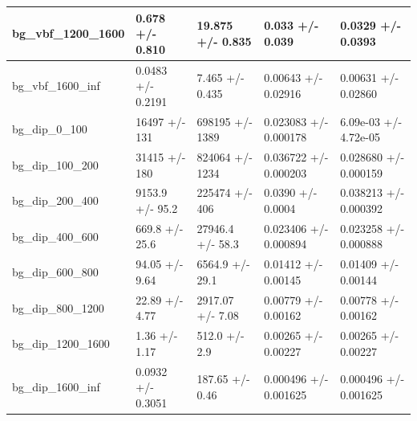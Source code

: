 \documentclass[a4paper, 10pt]{article}
\begin{document}
\begin{table}[H]
\begin{center}
\begin{tabular}{|m{20.0mm}|m{27.0mm}|m{27.0mm}|m{33.0mm}|m{32.0mm}|}
      \hline
      {\cellcolor{white}         bg\_vbf\_1200\_1600}& {\cellcolor{white}         0.678 +/\-- 0.810}& {\cellcolor{white}         19.875 +/\-- 0.835}& {\cellcolor{white}         0.033 +/\-- 0.039}& {\cellcolor{white}         0.0329 +/\-- 0.0393}\\
      \hline
      {\cellcolor{white}         bg\_vbf\_1600\_inf}& {\cellcolor{white}         0.0483 +/\-- 0.2191}& {\cellcolor{white}         7.465 +/\-- 0.435}& {\cellcolor{white}         0.00643 +/\-- 0.02916}& {\cellcolor{white}         0.00631 +/\-- 0.02860}\\
      \hline
      {\cellcolor{white}         bg\_dip\_0\_100}& {\cellcolor{white}         16497 +/\-- 131}& {\cellcolor{white}         698195 +/\-- 1389}& {\cellcolor{white}         0.023083 +/\-- 0.000178}& {\cellcolor{white}         6.09e-03 +/\-- 4.72e-05}\\
      \hline
      {\cellcolor{white}         bg\_dip\_100\_200}& {\cellcolor{white}         31415 +/\-- 180}& {\cellcolor{white}         824064 +/\-- 1234}& {\cellcolor{white}         0.036722 +/\-- 0.000203}& {\cellcolor{white}         0.028680 +/\-- 0.000159}\\
      \hline
      {\cellcolor{white}         bg\_dip\_200\_400}& {\cellcolor{white}         9153.9 +/\-- 95.2}& {\cellcolor{white}         225474 +/\-- 406}& {\cellcolor{white}         0.0390 +/\-- 0.0004}& {\cellcolor{white}         0.038213 +/\-- 0.000392}\\
      \hline
      {\cellcolor{white}         bg\_dip\_400\_600}& {\cellcolor{white}         669.8 +/\-- 25.6}& {\cellcolor{white}         27946.4 +/\-- 58.3}& {\cellcolor{white}         0.023406 +/\-- 0.000894}& {\cellcolor{white}         0.023258 +/\-- 0.000888}\\
      \hline
      {\cellcolor{white}         bg\_dip\_600\_800}& {\cellcolor{white}         94.05 +/\-- 9.64}& {\cellcolor{white}         6564.9 +/\-- 29.1}& {\cellcolor{white}         0.01412 +/\-- 0.00145}& {\cellcolor{white}         0.01409 +/\-- 0.00144}\\
      \hline
      {\cellcolor{white}         bg\_dip\_800\_1200}& {\cellcolor{white}         22.89 +/\-- 4.77}& {\cellcolor{white}         2917.07 +/\-- 7.08}& {\cellcolor{white}         0.00779 +/\-- 0.00162}& {\cellcolor{white}         0.00778 +/\-- 0.00162}\\
      \hline
      {\cellcolor{white}         bg\_dip\_1200\_1600}& {\cellcolor{white}         1.36 +/\-- 1.17}& {\cellcolor{white}         512.0 +/\-- 2.9}& {\cellcolor{white}         0.00265 +/\-- 0.00227}& {\cellcolor{white}         0.00265 +/\-- 0.00227}\\
      \hline
      {\cellcolor{white}         bg\_dip\_1600\_inf}& {\cellcolor{white}         0.0932 +/\-- 0.3051}& {\cellcolor{white}         187.65 +/\-- 0.46}& {\cellcolor{white}         0.000496 +/\-- 0.001625}& {\cellcolor{white}         0.000496 +/\-- 0.001625}\\
\hline
    \end{tabular}
  \end{center}
\end{table}
\end{document}
